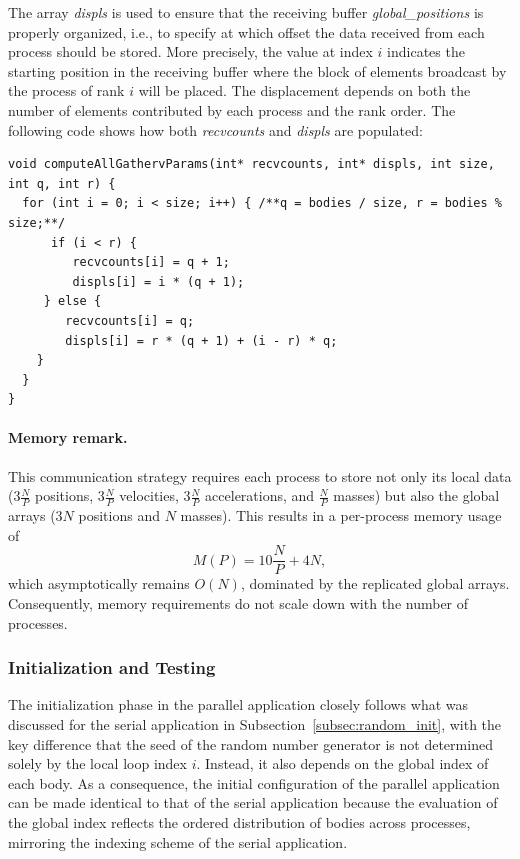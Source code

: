 \documentclass{article}
\begin{document}
The array \emph{displs} is used to ensure that the receiving buffer \emph{global\_positions} is properly organized, i.e., to specify at which offset the data received from each process should be stored.
More precisely, the value at index $i$ indicates the starting position in the receiving buffer where the block of elements broadcast by the process of rank $i$ will be placed. The displacement depends on both the number of elements contributed by each process and the rank order.
The following code shows how both \emph{recvcounts} and \emph{displs} are populated:
\begin{lstlisting}
void computeAllGathervParams(int* recvcounts, int* displs, int size, int q, int r) {
  for (int i = 0; i < size; i++) { /**q = bodies / size, r = bodies % size;**/
      if (i < r) {
         recvcounts[i] = q + 1;
         displs[i] = i * (q + 1);
     } else {
        recvcounts[i] = q;
        displs[i] = r * (q + 1) + (i - r) * q;
    }
  }
}
\end{lstlisting}

\paragraph{Memory remark.}
This communication strategy requires each process to store not only its local data ($3\frac{N}{P}$ positions, $3\frac{N}{P}$ velocities, $3\frac{N}{P}$ accelerations, and $\tfrac{N}{P}$ masses) but also the global arrays ($3N$ positions and $N$ masses).  
This results in a per-process memory usage of
\[
M(P) = 10\frac{N}{P} + 4N,
\]
which asymptotically remains $O(N)$, dominated by the replicated global arrays.
Consequently, memory requirements do not scale down with the number of processes.

\subsubsection{Initialization and Testing}
The initialization phase in the parallel application closely follows what was discussed for the serial application in Subsection~\ref{subsec:random_init}, with the key difference that the seed of the random number generator is not determined solely by the local loop index $i$. Instead, it also depends on the global index of each body.
As a consequence, the initial configuration of the parallel application can be made identical to that of the serial application because the evaluation of the global index reflects the ordered distribution of bodies across processes, mirroring the indexing scheme of the serial application.
 
\end{document}
